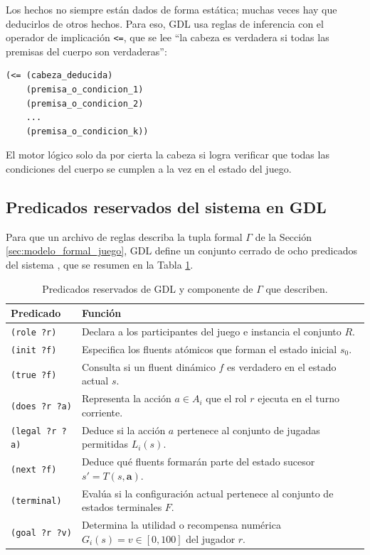 Los hechos no siempre están dados de forma estática; muchas veces hay que deducirlos de otros hechos. Para eso, GDL usa reglas de inferencia con el operador de implicación \texttt{<=}, que se lee ``la cabeza es verdadera si todas las premisas del cuerpo son verdaderas'':

\begin{lstlisting}[caption={Estructura canónica de una regla de inferencia en GDL.},label={lst:estructura_regla}]
(<= (cabeza_deducida)
    (premisa_o_condicion_1)
    (premisa_o_condicion_2)
    ...
    (premisa_o_condicion_k))
\end{lstlisting}

El motor lógico solo da por cierta la cabeza si logra verificar que todas las condiciones del cuerpo se cumplen a la vez en el estado del juego.

\subsection{Predicados reservados del sistema en GDL}
\label{subsec:predicados_reservados}

Para que un archivo de reglas describa la tupla formal $\Gamma$ de la Sección \ref{sec:modelo_formal_juego}, GDL define un conjunto cerrado de ocho predicados del sistema \cite{Love2008GDL, GeneserethThielscher2014}, que se resumen en la Tabla \ref{tab:predicados_gdl}.

\begin{table}[H]
\centering
\small
\caption{Predicados reservados de GDL y componente de $\Gamma$ que describen.}
\label{tab:predicados_gdl}
\begin{tabularx}{\textwidth}{@{}l X@{}}
\toprule
\textbf{Predicado} & \textbf{Función} \\
\midrule
\texttt{(role ?r)} & Declara a los participantes del juego e instancia el conjunto $R$. \\
\texttt{(init ?f)} & Especifica los fluents atómicos que forman el estado inicial $s_0$. \\
\texttt{(true ?f)} & Consulta si un fluent dinámico $f$ es verdadero en el estado actual $s$. \\
\texttt{(does ?r ?a)} & Representa la acción $a \in A_i$ que el rol $r$ ejecuta en el turno corriente. \\
\texttt{(legal ?r ?a)} & Deduce si la acción $a$ pertenece al conjunto de jugadas permitidas $L_i(s)$. \\
\texttt{(next ?f)} & Deduce qué fluents formarán parte del estado sucesor $s' = T(s, \mathbf{a})$. \\
\texttt{(terminal)} & Evalúa si la configuración actual pertenece al conjunto de estados terminales $F$. \\
\texttt{(goal ?r ?v)} & Determina la utilidad o recompensa numérica $G_i(s) = v \in [0, 100]$ del jugador $r$. \\
\bottomrule
\end{tabularx}
\end{table}

